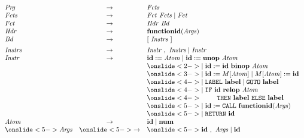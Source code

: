 \documentclass{beamer}
\begin{document}
\begin{frame}
\begin{columns}
{%
\[\begin{array}{lcl}
\mathit{Prg} & \rightarrow & \mathit{Fcts} \\
\mathit{Fcts}  & \rightarrow & \mathit{Fct~Fcts} \mid \mathit{Fct}\\
\mathit{Fct} & \rightarrow & \mathit{Hdr~Bd}\\
\mathit{Hdr} & \rightarrow & \mathbf{functionid}( \mathit{Args} ) \\
\mathit{Bd} & \rightarrow & [~\mathit{Instrs}~] \\[1ex]
\mathit{Instrs} & \rightarrow & \mathit{Instr~,~Instrs} \mid \mathit{Instr} \\
%
\mathit{Instr} & \rightarrow & 
\mathbf{id} := \mathit{Atom}\mid %
\mathbf{id} := \mathbf{unop}~ \mathit{Atom} \\
& & \onslide<2->{\mid \mathbf{id} := \mathbf{id} ~ \mathbf{binop}~ \mathit{Atom}} \\
& & \onslide<3->{\mid \mathbf{id} := M[\mathit{Atom}] \mid %
	M[\mathit{Atom}]  := \mathbf{id}} \\
& & \onslide<4->{\mid \mathtt{LABEL}~\mathbf{label} \mid %
	\mathtt{GOTO}~ \mathbf{label} }\\
& & \onslide<4->{\mid \mathtt{IF}~ \mathbf{id}~\mathbf{relop}~\mathit{Atom}}\\
& & \onslide<4->{\hspace*{2em}~\mathtt{THEN}~\mathbf{label}~\mathtt{ELSE}~\mathbf{label}} \\
& & \onslide<5->{\mid \mathbf{id} := \mathtt{CALL}~ \mathbf{functionid}( \mathit{Args} )}\\
& & \onslide<5->{\mid \mathtt{RETURN}~\mathbf{id} } \\
\mathit{Atom} & \rightarrow & \mathbf{id} \mid \mathbf{num} \\
\onslide<5->{\mathit{Args}} & \onslide<5->{\rightarrow} & \onslide<5->{\mathbf{id}~,~\mathit{Args} \mid \mathbf{id} }
\end{array}\]
}


\end{columns}

\end{frame}
\end{document}
